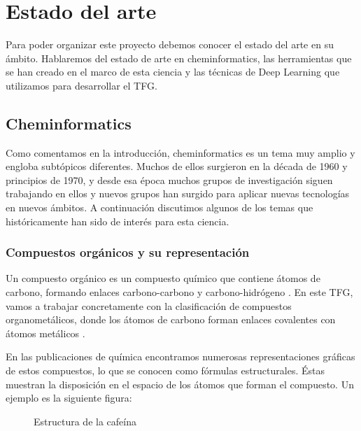 \chapter*{Estado del arte}
Para poder organizar este proyecto debemos conocer el estado del arte en su ámbito. Hablaremos del estado de arte en cheminformatics, las herramientas que se han creado en el marco de esta ciencia y las técnicas de Deep Learning que utilizamos para desarrollar el TFG.

\section*{Cheminformatics}
Como comentamos en la introducción, cheminformatics es un tema muy amplio y engloba subtópicos diferentes. Muchos de ellos surgieron en la década de 1960 y principios de 1970, y desde esa época muchos grupos de investigación siguen trabajando en ellos y nuevos grupos han surgido para aplicar nuevas tecnologías en nuevos ámbitos. A continuación discutimos algunos de los temas que históricamente han sido de interés para esta ciencia. \cite{doi:10.1021/ci600234z}

\subsection*{Compuestos orgánicos y su representación}
Un compuesto orgánico es un compuesto químico que contiene átomos de carbono, formando enlaces carbono-carbono y carbono-hidrógeno \cite{comporganico}. En este TFG, vamos a trabajar concretamente con la clasificación de compuestos organometálicos, donde los átomos de carbono forman enlaces covalentes con átomos metálicos \cite{comporganometalico}.

En las publicaciones de química encontramos numerosas representaciones gráficas de estos compuestos, lo que se conocen como fórmulas estructurales. Éstas muestran la disposición en el espacio de los átomos que forman el compuesto. Un ejemplo es la siguiente figura:

\begin{figure}[H]
\centering
    \caption{Estructura de la cafeína} \label{fig:figura1}
\end{figure}

